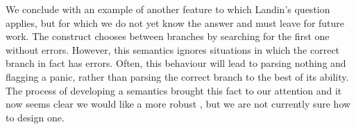 We conclude with an example of another feature to which Landin's
question applies, but for which we do not yet know the answer and must
leave for future work. The \Punion{}
construct chooses between branches by searching for the first one
without errors. However, this semantics ignores situations in which
the correct branch in fact has errors. Often, this behaviour will lead
to parsing nothing and flagging a panic, rather than parsing the
correct branch to the best of its ability.  The process of
developing a semantics brought this fact to our attention and
it now seems clear we would like a more robust
\Punion, but we are not currently sure how to design one. 







